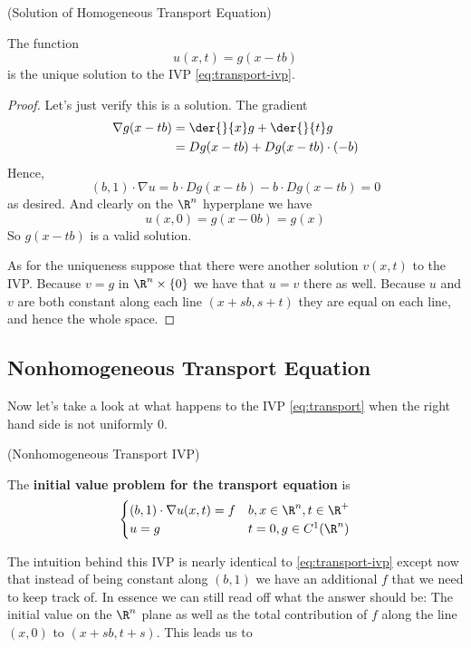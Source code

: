 \documentclass{bkcnotes}
\begin{document}
\begin{nthm}(Solution of Homogeneous Transport Equation)

  The function
  \begin{equation}
    \label{eq:transport-sol}
    u(x,t) = g(x-tb)
  \end{equation}
  is the unique solution to the IVP \eqref{eq:transport-ivp}.
\end{nthm}
\begin{proof}
  Let's just verify this is a solution. The gradient
  \begin{equation}
    \label{eq:grad-sol}
    \begin{aligned}
      \nabla g(x-tb) &= \der{}{x}g + \der{}{t}g \\
      &= Dg(x-tb) + Dg(x-tb)\cdot(-b)
    \end{aligned}
  \end{equation}
  Hence,
  \begin{equation}
    (b,1) \cdot \nabla u = b \cdot Dg(x-tb) - b\cdot Dg(x-tb) = 0
  \end{equation}
  as desired. And clearly on the $\R^n$ hyperplane we have
  \begin{equation}
    u(x,0) = g(x - 0b) = g(x)
  \end{equation}
  So $g(x-tb)$ is a valid solution.

  As for the uniqueness suppose that there were another solution
  $v(x,t)$ to the IVP. Because $v = g$ in $\R^n \times \{0\}$ we have
  that $u=v$ there as well. Because $u$ and $v$ are both constant
  along each line $(x+sb,s+t)$ they are equal on each line, and hence
  the whole space.
\end{proof}

\subsection{Nonhomogeneous Transport Equation}
Now let's take a look at what happens to the IVP \eqref{eq:transport}
when the right hand side is not uniformly 0.

\begin{ndefn}(Nonhomogeneous Transport IVP)

  The \textbf{initial value problem for the transport equation} is
  \begin{equation}
    \label{eq:ntransport-ivp}
    \begin{cases}
      (b,1) \cdot \nabla u(x,t) = f & b,x \in \R^n, t \in \R^+ \\
      u = g & t = 0, g \in C^1(\R^n)
    \end{cases}
  \end{equation}
\end{ndefn}
The intuition behind this IVP is nearly identical to
\eqref{eq:transport-ivp} except now that instead of being constant
along $(b,1)$ we have an additional $f$ that we need to keep track
of. In essence we can still read off what the answer should be: The
initial value on the $\R^n$ plane as well as the total contribution of
$f$ along the line $(x,0)$ to $(x+sb,t+s)$. This leads us to
\end{document}
